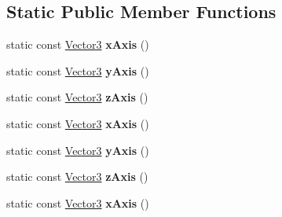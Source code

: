 \subsection*{Static Public Member Functions}
\begin{DoxyCompactItemize}
\item 
\hypertarget{classVectormath_1_1Aos_1_1Vector3_a61e194472d97c39a1116835a96276ac4}{static const \hyperlink{classVectormath_1_1Aos_1_1Vector3}{Vector3} {\bfseries x\-Axis} ()}\label{classVectormath_1_1Aos_1_1Vector3_a61e194472d97c39a1116835a96276ac4}

\item 
\hypertarget{classVectormath_1_1Aos_1_1Vector3_a7b84f784fbbe63826fc948aca923ad4b}{static const \hyperlink{classVectormath_1_1Aos_1_1Vector3}{Vector3} {\bfseries y\-Axis} ()}\label{classVectormath_1_1Aos_1_1Vector3_a7b84f784fbbe63826fc948aca923ad4b}

\item 
\hypertarget{classVectormath_1_1Aos_1_1Vector3_a085a256359510b82d821a9dfb6a29991}{static const \hyperlink{classVectormath_1_1Aos_1_1Vector3}{Vector3} {\bfseries z\-Axis} ()}\label{classVectormath_1_1Aos_1_1Vector3_a085a256359510b82d821a9dfb6a29991}

\item 
\hypertarget{classVectormath_1_1Aos_1_1Vector3_adb14735bfe8dfe9a47d40101df2d6bac}{static const \hyperlink{classVectormath_1_1Aos_1_1Vector3}{Vector3} {\bfseries x\-Axis} ()}\label{classVectormath_1_1Aos_1_1Vector3_adb14735bfe8dfe9a47d40101df2d6bac}

\item 
\hypertarget{classVectormath_1_1Aos_1_1Vector3_a294d0afafac74a08da052b0634933c8d}{static const \hyperlink{classVectormath_1_1Aos_1_1Vector3}{Vector3} {\bfseries y\-Axis} ()}\label{classVectormath_1_1Aos_1_1Vector3_a294d0afafac74a08da052b0634933c8d}

\item 
\hypertarget{classVectormath_1_1Aos_1_1Vector3_adb1dcbe829b75d5a1b6e57e7dc283394}{static const \hyperlink{classVectormath_1_1Aos_1_1Vector3}{Vector3} {\bfseries z\-Axis} ()}\label{classVectormath_1_1Aos_1_1Vector3_adb1dcbe829b75d5a1b6e57e7dc283394}

\item 
\hypertarget{classVectormath_1_1Aos_1_1Vector3_adb14735bfe8dfe9a47d40101df2d6bac}{static const \hyperlink{classVectormath_1_1Aos_1_1Vector3}{Vector3} {\bfseries x\-Axis} ()}\label{classVectormath_1_1Aos_1_1Vector3_adb14735bfe8dfe9a47d40101df2d6bac}


\end{DoxyCompactItemize}
